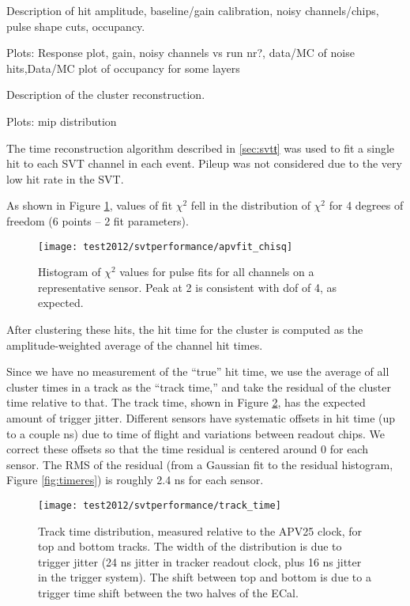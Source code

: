 \vspace{1cm}{\bf Calibration [Omar]}


Description of hit amplitude, baseline/gain calibration, noisy channels/chips, pulse shape cuts, occupancy. 

Plots: Response plot, gain, noisy channels vs run nr?, data/MC of noise hits,Data/MC plot of occupancy for some layers  

\vspace{1cm}{\bf Cluster reconstruction [Omar]}


Description of the cluster reconstruction.

Plots: mip distribution

\vspace{1cm}{\bf SVT timing [Sho]}

The time reconstruction algorithm described in \ref{sec:svtŧ} was used to fit a single hit to each SVT channel in each event.
Pileup was not considered due to the very low hit rate in the SVT.

As shown in Figure \ref{fig:apvfit}, values of fit $\chi^2$ fell in the distribution of $\chi^2$ for 4 degrees of freedom (6 points -- 2 fit parameters).

\begin{figure}[ht]
	\texttt{[image: test2012/svtperformance/apvfit\_chisq]}
	\caption{\small{Histogram of $\chi^2$ values for pulse fits for all channels on a representative sensor. Peak at 2 is consistent with dof of 4, as expected.} }
	\label{fig:apvfit}
\end{figure}

After clustering these hits, the hit time for the cluster is computed as the amplitude-weighted average of the channel hit times. 



Since we have no measurement of the ``true'' hit time, we use the average of all cluster times in a track as the ``track time,'' and take the residual of the cluster time relative to that.
The track time, shown in Figure \ref{fig:tracktime}, has the expected amount of trigger jitter.
Different sensors have systematic offsets in hit time (up to a couple ns) due to time of flight and variations between readout chips. 
We correct these offsets so that the time residual is centered around 0 for each sensor. The RMS of the residual (from a Gaussian fit to the residual histogram, Figure \ref{fig:timeres}) is roughly 2.4 ns for each sensor.

\begin{figure}[ht]
	\texttt{[image: test2012/svtperformance/track\_time]}
	\caption{\small{Track time distribution, measured relative
	to the APV25 clock, for top and bottom tracks. The
width of the distribution is due to trigger jitter (24 ns
jitter in tracker readout clock, plus 16 ns jitter in the
trigger system). The shift between top and bottom
is due to a trigger time shift between the two halves
of the ECal.} }
	\label{fig:tracktime}
\end{figure}


